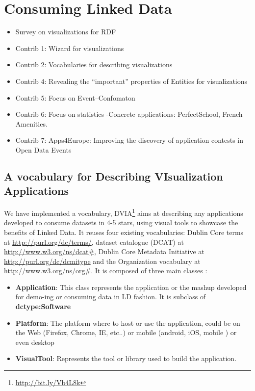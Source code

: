 \chapter{Consuming Linked Data}
\label{ch:ch5}

\begin{itemize}
\item Survey on visualizations for RDF
\item Contrib 1: Wizard for visualizations
\item Contrib 2: Vocabularies for describing visualizations
\item Contrib 4: Revealing the ``important'' properties of Entities for visualizations
\item Contrib 5: Focus on Event--Confomaton
\item Contrib 6: Focus on statistics -Concrete applications: PerfectSchool, French Amenities.
\item Contrib 7: Apps4Europe: Improving the discovery of application contests in Open Data Events

\end{itemize}


\section{A vocabulary for Describing VIsualization Applications} \label{sec:dvia}

We have implemented a vocabulary, DVIA\footnote{\url{http://bit.ly/Vb4L8k}} aims at describing any applications developed to consume datasets in 4-5 stars, using visual tools to showcase the benefits of Linked Data. It reuses four existing vocabularies: Dublin Core terms at \url{http://purl.org/dc/terms/}, dataset catalogue (DCAT) at \url{http://www.w3.org/ns/dcat#}, Dublin Core Metadata Initiative at \url{http://purl.org/dc/dcmitype} and the Organization vocabulary at \url{http://www.w3.org/ns/org#}.  It is composed of three main classes : 

\begin{itemize}
\item \textbf{Application}: This class represents the application or the mashup developed for demo-ing or consuming data in LD fashion. It is subclass of \textbf{dctype:Software}
\item \textbf{Platform}: The platform where to host or use the application, could be on the Web (Firefox, Chrome, IE, etc..) or mobile (android, iOS, mobile ) or even desktop
\item \textbf{VisualTool}: Represents the tool or library used to build the application. 
\end{itemize}

